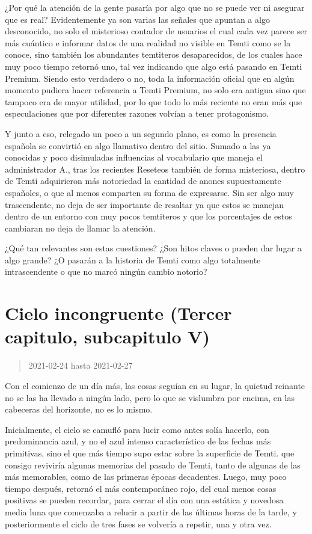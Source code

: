 \documentclass[
  spanish,
]{book}
\begin{document}
¿Por qué la atención de la gente pasaría por algo que no se puede ver ni asegurar que es real? Evidentemente ya son varias las señales que apuntan a algo desconocido, no solo el misterioso contador de usuarios el cual cada vez parece ser más cuántico e informar datos de una realidad no visible en Temti como se la conoce, sino también los abundantes temtiteros desaparecidos, de los cuales hace muy poco tiempo retornó uno, tal vez indicando que algo está pasando en Temti Premium.
Siendo esto verdadero o no, toda la información oficial que en algún momento pudiera hacer referencia a Temti Premium, no solo era antigua sino que tampoco era de mayor utilidad, por lo que todo lo más reciente no eran más que especulaciones que por diferentes razones volvían a tener protagonismo.

Y junto a eso, relegado un poco a un segundo plano, es como la presencia española se convirtió en algo llamativo dentro del sitio. Sumado a las ya conocidas y poco disimuladas influencias al vocabulario que maneja el administrador A., tras los recientes Reseteos también de forma misteriosa, dentro de Temti adquirieron más notoriedad la cantidad de anones supuestamente españoles, o que al menos comparten su forma de expresarse. Sin ser algo muy trascendente, no deja de ser importante de resaltar ya que estos se manejan dentro de un entorno con muy pocos temtiteros y que los porcentajes de estos cambiaran no deja de llamar la atención.

¿Qué tan relevantes son estas cuestiones? ¿Son hitos claves o pueden dar lugar a algo grande? ¿O pasarán a la historia de Temti como algo totalmente intrascendente o que no marcó ningún cambio notorio?

\hypertarget{cielo-incongruente-tercer-capitulo-subcapitulo-v}{%
\section{Cielo incongruente (Tercer capitulo, subcapitulo V)}\label{cielo-incongruente-tercer-capitulo-subcapitulo-v}}

\begin{quote}
2021-02-24 hasta 2021-02-27
\end{quote}

Con el comienzo de un día más, las cosas seguían en su lugar, la quietud reinante no se las ha llevado a ningún lado, pero lo que se vislumbra por encima, en las cabeceras del horizonte, no es lo mismo.

Inicialmente, el cielo se camufló para lucir como antes solía hacerlo, con predominancia azul, y no el azul intenso característico de las fechas más primitivas, sino el que más tiempo supo estar sobre la superficie de Temti. que consigo reviviría algunas memorias del pasado de Temti, tanto de algunas de las más memorables, como de las primeras épocas decadentes. Luego, muy poco tiempo después, retornó el más contemporáneo rojo, del cual menos cosas positivas se pueden recordar, para cerrar el día con una estática y novedosa media luna que comenzaba a relucir a partir de las últimas horas de la tarde, y posteriormente el ciclo de tres fases se volvería a repetir, una y otra vez.
\end{document}
